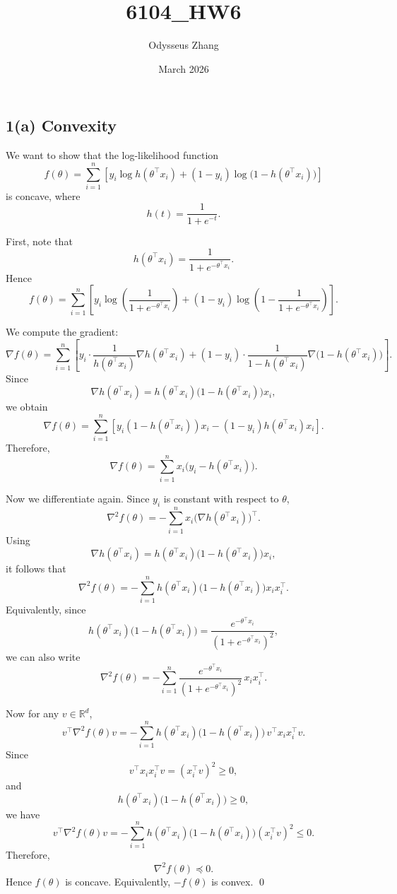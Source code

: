 \documentclass{article}
\title{6104_HW6}
\author{Odysseus Zhang}
\date{March 2026}
\begin{document}
\subsection*{1(a) Convexity}

We want to show that the log-likelihood function
\[
f(\theta)=\sum_{i=1}^n \left[y_i \log h(\theta^\top x_i) + (1-y_i)\log\bigl(1-h(\theta^\top x_i)\bigr)\right]
\]
is concave, where
\[
h(t)=\frac{1}{1+e^{-t}}.
\]

First, note that
\[
h(\theta^\top x_i)=\frac{1}{1+e^{-\theta^\top x_i}}.
\]
Hence
\[
f(\theta)
=
\sum_{i=1}^n
\left[
y_i \log\left(\frac{1}{1+e^{-\theta^\top x_i}}\right)
+
(1-y_i)\log\left(1-\frac{1}{1+e^{-\theta^\top x_i}}\right)
\right].
\]

We compute the gradient:
\[
\nabla f(\theta)
=
\sum_{i=1}^n
\left[
y_i \cdot \frac{1}{h(\theta^\top x_i)} \nabla h(\theta^\top x_i)
+
(1-y_i)\cdot \frac{1}{1-h(\theta^\top x_i)} \nabla\bigl(1-h(\theta^\top x_i)\bigr)
\right].
\]
Since
\[
\nabla h(\theta^\top x_i)=h(\theta^\top x_i)\bigl(1-h(\theta^\top x_i)\bigr)x_i,
\]
we obtain
\[
\nabla f(\theta)
=
\sum_{i=1}^n
\left[
y_i(1-h(\theta^\top x_i))x_i-(1-y_i)h(\theta^\top x_i)x_i
\right].
\]
Therefore,
\[
\nabla f(\theta)
=
\sum_{i=1}^n x_i\bigl(y_i-h(\theta^\top x_i)\bigr).
\]

Now we differentiate again. Since \(y_i\) is constant with respect to \(\theta\),
\[
\nabla^2 f(\theta)
=
-\sum_{i=1}^n x_i \bigl(\nabla h(\theta^\top x_i)\bigr)^\top.
\]
Using
\[
\nabla h(\theta^\top x_i)
=
h(\theta^\top x_i)\bigl(1-h(\theta^\top x_i)\bigr)x_i,
\]
it follows that
\[
\nabla^2 f(\theta)
=
-\sum_{i=1}^n h(\theta^\top x_i)\bigl(1-h(\theta^\top x_i)\bigr)x_i x_i^\top.
\]
Equivalently, since
\[
h(\theta^\top x_i)\bigl(1-h(\theta^\top x_i)\bigr)
=
\frac{e^{-\theta^\top x_i}}{(1+e^{-\theta^\top x_i})^2},
\]
we can also write
\[
\nabla^2 f(\theta)
=
-\sum_{i=1}^n
\frac{e^{-\theta^\top x_i}}{(1+e^{-\theta^\top x_i})^2}\, x_i x_i^\top.
\]

Now for any \(v\in\mathbb{R}^d\),
\[
v^\top \nabla^2 f(\theta) v
=
-\sum_{i=1}^n
h(\theta^\top x_i)\bigl(1-h(\theta^\top x_i)\bigr)\, v^\top x_i x_i^\top v.
\]
Since
\[
v^\top x_i x_i^\top v = (x_i^\top v)^2 \ge 0,
\]
and
\[
h(\theta^\top x_i)\bigl(1-h(\theta^\top x_i)\bigr)\ge 0,
\]
we have
\[
v^\top \nabla^2 f(\theta) v
=
-\sum_{i=1}^n
h(\theta^\top x_i)\bigl(1-h(\theta^\top x_i)\bigr)(x_i^\top v)^2
\le 0.
\]
Therefore,
\[
\nabla^2 f(\theta)\preceq 0.
\]
Hence \(f(\theta)\) is concave. Equivalently, \(-f(\theta)\) is convex. \qed
\end{document}
